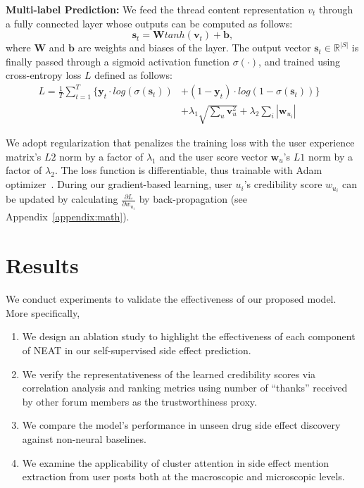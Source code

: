 \documentclass{bmcart}
\begin{document}
\textbf{Multi-label Prediction:} We feed the thread content
representation $v_t$ through a fully connected layer whose outputs can be computed as follows:
\begin{equation}\label{eq:dense}
\boldsymbol{s}_{t}=\boldsymbol{W}tanh(\boldsymbol{v}_{t})+\boldsymbol{b}, 
\end{equation}
where $\boldsymbol{W}$ and $\boldsymbol{b}$ are weights and biases of
the layer. The output vector $\boldsymbol{s}_{t} \in \mathbb{R}^{|S|}$
is finally passed through a sigmoid activation function $\sigma(\cdot)$,
and trained using cross-entropy loss $L$ defined as follows:   
\begin{equation}\label{eq:overall_loss}
  \begin{aligned}
    L=\frac{1}{T}\sum^T_{t=1}\{\boldsymbol{y}_{t} \cdot log(\sigma(\boldsymbol{s}_{t}))&+(1-\boldsymbol{y}_{t})\cdot log(1-\sigma(\boldsymbol{s}_{t}))\}& \\ 
    &+\lambda_1\sqrt{\sum_{u}\boldsymbol{v}_{u}^{2}}+\lambda_2\sum_{i}{{|\boldsymbol{w}_{u_{i}}|}}&
  \end{aligned}
\end{equation}

We adopt regularization that penalizes the training loss with the user
experience matrix's $L2$ norm by a factor of $\lambda_1$ and the user score vector $\boldsymbol{w}_{u}$'s $L1$ norm by a factor of $\lambda_2$. The loss function is differentiable, thus
trainable with Adam optimizer~\cite{kingma2015adam}. 
During our gradient-based learning, 
user ${u_i}$'s credibility score $w_{u_i}$ can be updated by calculating 
$\frac{\partial L}{\partial w_{u_i}}$ by back-propagation (see Appendix~\ref{appendix:math}).

\section{Results}\label{sec:results}

We conduct experiments to validate the effectiveness of our proposed model. More specifically,
\begin{enumerate}
    \item We design an ablation study to highlight the effectiveness of each component of NEAT in our self-supervised side effect prediction.
    \item We verify the representativeness of the learned credibility scores via correlation analysis and ranking metrics using number of ``thanks'' received by other forum members as the trustworthiness proxy.
    \item We compare the model's performance in unseen drug side effect discovery against non-neural baselines.
    \item We examine the applicability of cluster attention in side effect mention extraction from user posts both at the macroscopic and microscopic levels. \\
\end{enumerate}
\end{document}
